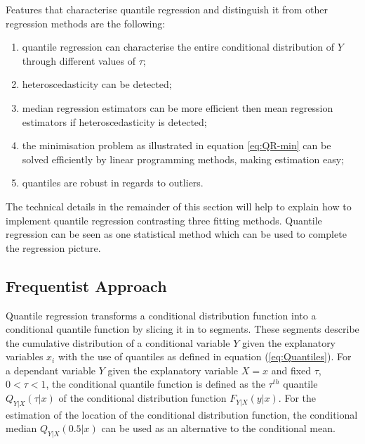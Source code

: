 \documentclass[12pt,a4paper]{report}
\begin{document}
\begin{flushleft}
Features that characterise quantile regression and distinguish it from other regression methods are the following:
\end{flushleft}
\begin{enumerate}
    \item quantile regression can characterise the entire conditional distribution of $Y$ through different values of $\tau$;
    \item heteroscedasticity can be detected;
    \item median regression estimators can be more efficient then mean regression estimators if heteroscedasticity is detected;
    \item the minimisation problem as illustrated in equation \ref{eq:QR-min} can be solved efficiently by linear programming methods, making estimation easy;
    \item quantiles are robust in regards to outliers.
\end{enumerate}

The technical details in the remainder of this section will help to explain how to implement quantile regression contrasting three fitting methods. Quantile regression can be seen as one statistical method which can be used to complete the regression picture.

\subsection{Frequentist Approach}\label{Background:FA}
Quantile regression transforms a conditional distribution function into a conditional quantile function by slicing it in to segments. These segments describe the cumulative distribution of a conditional variable $Y$ given the explanatory variables $x_{i}$ with the use of quantiles as defined in equation (\ref{eq:Quantiles}). For a dependant variable $Y$ given the explanatory variable $X=x$ and fixed $\tau$, $0<\tau<1$, the conditional quantile function is defined as the $\tau^{th}$ quantile $Q_{Y|X}(\tau|x)$ of the conditional distribution function $F_{Y|X}(y|x)$. For the estimation of the location of the conditional distribution function, the conditional median $Q_{Y|X}(0.5|x)$ can be used as an alternative to the conditional mean.
\vspace{2mm}
\end{document}
